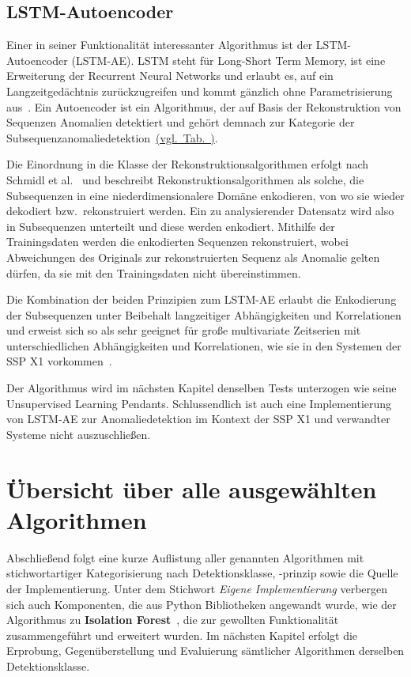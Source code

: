 \subsection{LSTM-Autoencoder}
Einer in seiner Funktionalität interessanter Algorithmus ist der LSTM-Autoencoder (LSTM-AE). LSTM steht für Long-Short Term Memory, ist eine Erweiterung der
Recurrent Neural Networks und erlaubt es, auf ein Langzeitgedächtnis zurückzugreifen und kommt gänzlich ohne Parametrisierung aus~\cite{Hochreiter1997}.
Ein Autoencoder ist ein Algorithmus, der auf Basis der Rekonstruktion von Sequenzen Anomalien detektiert und gehört demnach zur Kategorie der
Subsequenzanomaliedetektion~\hyperref[tab:algorithmen]{(vgl.~Tab.~)}.

Die Einordnung in die Klasse der Rekonstruktionsalgorithmen erfolgt nach Schmidl et al.~\cite{Schmidl2022} und beschreibt Rekonstruktionsalgorithmen
als solche, die Subsequenzen in eine niederdimensionalere Do\-mäne enkodieren, von wo sie wieder dekodiert bzw.~rekonstruiert werden. Ein zu analysierender
Datensatz wird also in Subsequenzen unterteilt und diese werden enkodiert. Mithilfe der Trainingsdaten werden die enkodierten Sequenzen rekonstruiert,
wobei Abweichungen des Originals zur rekonstruierten Sequenz als Anomalie gelten dürfen, da sie mit den Trainingsdaten nicht übereinstimmen.

Die Kombination der beiden Prinzipien zum LSTM-AE erlaubt die Enkodierung der Subsequenzen unter Beibehalt langzeitiger Abhängigkeiten und Korrelationen
und erweist sich so als sehr geeignet für große multivariate Zeitserien mit unterschiedlichen Abhängigkeiten und Korrelationen, wie sie in den Systemen
der SSP X1 vorkommen~\cite{Wei2022}.

Der Algorithmus wird im nächsten Kapitel denselben Tests unterzogen wie seine Unsupervised Learning Pendants. Schlussendlich ist auch eine
Implementierung von LSTM-AE zur Anomaliedetektion im Kontext der SSP X1 und verwandter Systeme nicht auszuschließen.

\section{Übersicht über alle ausgewählten Algorithmen}

Abschließend folgt eine kurze Auflistung aller genannten Algorithmen mit stichwortartiger Kategorisierung nach Detektionsklasse, -prinzip sowie die Quelle der
Implementierung. Unter dem Stichwort \textit{Eigene Implementierung} verbergen sich auch Komponenten, die aus Python Bibliotheken angewandt wurde, wie der
Algorithmus zu \textbf{Isolation Forest}~\cite{scikit-learn}, die zur gewollten Funktionalität
zusammengeführt und erweitert wurden. Im nächsten Kapitel erfolgt die Erprobung, Gegenüberstellung und Evaluierung sämtlicher Algorithmen derselben
Detektionsklasse.

